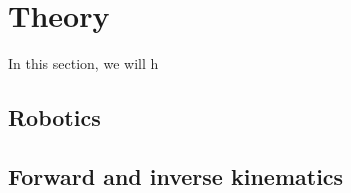 \section{Theory}
\label{theory}

In this section, we will h

\subsection{Robotics}
\label{theory/robotics}

\subsection{Forward and inverse kinematics}
\label{theory/kinematics}
